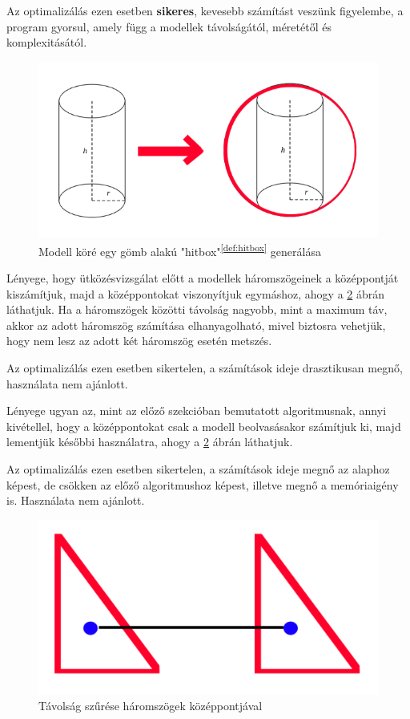 Az optimalizálás ezen esetben \textbf{sikeres}, kevesebb számítást veszünk figyelembe, a program gyorsul, amely függ a modellek távolságától, méretétől és komplexitásától.
\begin{figure}[h]
	\centering
	\includegraphics[width=13truecm, height=7.5truecm]{images/opt_5.1.png}
	\caption{Modell köré egy gömb alakú "hitbox"\textsuperscript{\ref{def:hitbox}} generálása}
	\label{fig:opt_1}
\end{figure}

\newpage
{}
Lényege, hogy ütközésvizsgálat előtt a modellek háromszögeinek a középpontját kiszámítjuk, majd a középpontokat viszonyítjuk egymáshoz, ahogy a \ref{fig:opt_2} ábrán láthatjuk. Ha a háromszögek közötti távolság nagyobb, mint a maximum táv, akkor az adott háromszög számítása elhanyagolható, mivel biztosra vehetjük, hogy nem lesz az adott két háromszög esetén metszés.

Az optimalizálás ezen esetben sikertelen, a számítások ideje drasztikusan megnő, használata nem ajánlott.

Lényege ugyan az, mint az előző szekcióban bemutatott algoritmusnak, annyi kivétellel, hogy a középpontokat csak a modell beolvasásakor számítjuk ki, majd lementjük későbbi használatra, ahogy a \ref{fig:opt_2} ábrán láthatjuk.

Az optimalizálás ezen esetben sikertelen, a számítások ideje megnő az alaphoz képest, de csökken az előző algoritmushoz képest, illetve megnő a memóriaigény is. Használata nem ajánlott.
\begin{figure}[h]
	\centering
	\includegraphics[width=13truecm, height=7.5truecm]{images/opt_5.2.png}
	\caption{Távolság szűrése háromszögek középpontjával}
	\label{fig:opt_2}
\end{figure}

